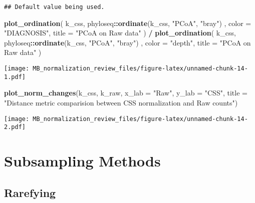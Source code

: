 \documentclass[
]{book}
\newenvironment{Shaded}{\begin{snugshade}}{\end{snugshade}}
\newcommand{\DataTypeTok}[1]{\textcolor[rgb]{0.13,0.29,0.53}{#1}}
\newcommand{\KeywordTok}[1]{\textcolor[rgb]{0.13,0.29,0.53}{\textbf{#1}}}
\newcommand{\NormalTok}[1]{#1}
\newcommand{\OperatorTok}[1]{\textcolor[rgb]{0.81,0.36,0.00}{\textbf{#1}}}
\newcommand{\StringTok}[1]{\textcolor[rgb]{0.31,0.60,0.02}{#1}}
\begin{document}
\begin{verbatim}
## Default value being used.
\end{verbatim}

\begin{Shaded}
\begin{Highlighting}[]
\KeywordTok{plot\_ordination}\NormalTok{(}
\NormalTok{    k\_css,}
\NormalTok{    phyloseq}\OperatorTok{::}\KeywordTok{ordinate}\NormalTok{(k\_css, }\StringTok{"PCoA"}\NormalTok{, }\StringTok{"bray"}\NormalTok{) ,}
    \DataTypeTok{color =} \StringTok{"DIAGNOSIS"}\NormalTok{,}
    \DataTypeTok{title =} \StringTok{"PCoA on Raw data"}
\NormalTok{) }\OperatorTok{/}
\StringTok{    }\KeywordTok{plot\_ordination}\NormalTok{(}
\NormalTok{        k\_css,}
\NormalTok{        phyloseq}\OperatorTok{::}\KeywordTok{ordinate}\NormalTok{(k\_css, }\StringTok{"PCoA"}\NormalTok{, }\StringTok{"bray"}\NormalTok{) ,}
        \DataTypeTok{color =} \StringTok{"depth"}\NormalTok{,}
        \DataTypeTok{title =} \StringTok{"PCoA on Raw data"}
\NormalTok{    )}
\end{Highlighting}
\end{Shaded}

\texttt{[image: MB\_normalization\_review\_files/figure-latex/unnamed-chunk-14-1.pdf]}

\begin{Shaded}
\begin{Highlighting}[]
\KeywordTok{plot\_norm\_changes}\NormalTok{(k\_css, k\_raw, }
                  \DataTypeTok{x\_lab =} \StringTok{"Raw"}\NormalTok{, }\DataTypeTok{y\_lab =} \StringTok{"CSS"}\NormalTok{,}
                  \DataTypeTok{title =} \StringTok{"Distance metric comparision between CSS normalization and Raw counts"}\NormalTok{)}
\end{Highlighting}
\end{Shaded}

\texttt{[image: MB\_normalization\_review\_files/figure-latex/unnamed-chunk-14-2.pdf]}

\hypertarget{subsampling-methods}{%
\chapter{Subsampling Methods}\label{subsampling-methods}}

\hypertarget{rarefying}{%
\section{Rarefying}\label{rarefying}}
\end{document}

